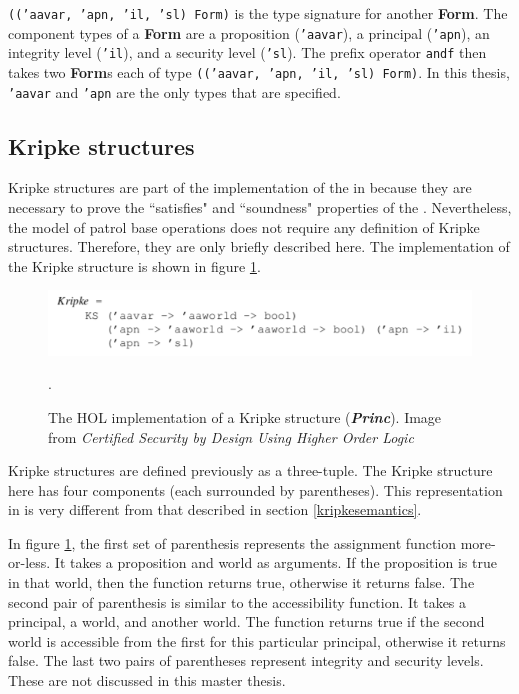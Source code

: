 \documentclass[../../main/main.tex]{subfiles}
\begin{document}
\texttt{(('aavar, 'apn, 'il, 'sl) Form)} is the type signature for another \textbf{Form}.  The component types of a \textbf{Form} are a proposition (\texttt{'aavar}), a principal (\texttt{'apn}), an integrity level (\texttt{'il}), and a security level (\texttt{'sl}).  The prefix operator \texttt{andf} then takes two \textbf{Form}s each of type \texttt{(('aavar, 'apn, 'il, 'sl) Form)}.  In this thesis, \texttt{'aavar} and \texttt{'apn} are the only types that are specified. 

\subsection{Kripke structures}
Kripke structures are part of the implementation of the  in  because they are necessary to prove the ``satisfies" and ``soundness" properties of the .  Nevertheless, the model of patrol base operations does not require any definition of Kripke structures. Therefore, they are only briefly described here. The  implementation of the Kripke structure is shown in figure \ref{kripkehol}.

\begin{figure}[h]
\centering
\includegraphics[width=1.0\textwidth]{../figures/kripkehol}
\caption{\label{kripkehol}The HOL implementation of a Kripke structure (\textbf{\textit{Princ}}).  Image from  \textit{Certified Security by Design Using Higher Order Logic}\cite{certmanual}}.  
\end{figure}

Kripke structures are defined previously as a three-tuple.  The Kripke structure here has four components (each surrounded by parentheses). This representation in  is very different from that described in section \ref{kripkesemantics}. 

In figure \ref{kripkehol}, the first set of parenthesis represents the assignment function more-or-less. It takes a proposition and world as arguments.  If the proposition is true in that world, then the function returns true, otherwise it returns false.  The second pair of parenthesis is similar to the accessibility function.  It takes a principal, a world, and another world.  The function returns true if the second world is accessible from the first for this particular principal, otherwise it returns false.  The last two pairs of parentheses represent integrity and security levels.  These are not discussed in this master thesis.  
\end{document}
